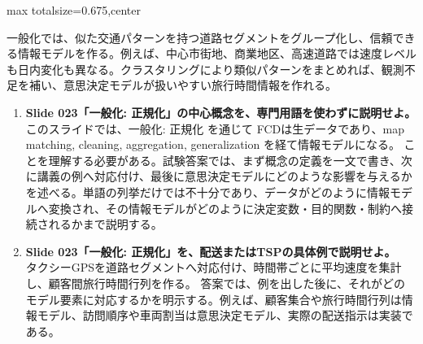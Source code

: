 \begin{adjustbox}{max totalsize={\textwidth}{0.675\textheight},center}
\begin{minipage}{\textwidth}
\begin{minipage}[t]{0.485\textwidth}
一般化では、似た交通パターンを持つ道路セグメントをグループ化し、信頼できる情報モデルを作る。例えば、中心市街地、商業地区、高速道路では速度レベルも日内変化も異なる。クラスタリングにより類似パターンをまとめれば、観測不足を補い、意思決定モデルが扱いやすい旅行時間情報を作れる。\par
{}
\begin{enumerate}
\item \textbf{Slide 023「一般化: 正規化」の中心概念を、専門用語を使わずに説明せよ。}\\このスライドでは、一般化: 正規化 を通じて FCDは生データであり、map matching, cleaning, aggregation, generalization を経て情報モデルになる。 ことを理解する必要がある。試験答案では、まず概念の定義を一文で書き、次に講義の例へ対応付け、最後に意思決定モデルにどのような影響を与えるかを述べる。単語の列挙だけでは不十分であり、データがどのように情報モデルへ変換され、その情報モデルがどのように決定変数・目的関数・制約へ接続されるかまで説明する。
\item \textbf{Slide 023「一般化: 正規化」を、配送またはTSPの具体例で説明せよ。}\\タクシーGPSを道路セグメントへ対応付け、時間帯ごとに平均速度を集計し、顧客間旅行時間行列を作る。 答案では、例を出した後に、それがどのモデル要素に対応するかを明示する。例えば、顧客集合や旅行時間行列は情報モデル、訪問順序や車両割当は意思決定モデル、実際の配送指示は実装である。
\end{enumerate}
\end{minipage}
\end{minipage}
\end{adjustbox}

